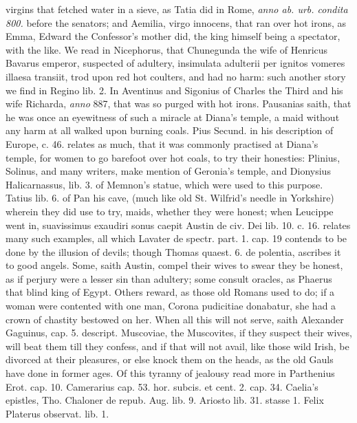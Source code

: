 virgins that fetched water in a sieve, as Tatia did in Rome, \emph{anno ab.
urb. condita 800.} before the senators; and Aemilia, virgo
innocens, that ran over hot irons, as Emma, Edward the Confessor's
mother did, the king himself being a spectator, with the like. We read
in Nicephorus, that Chunegunda the wife of Henricus Bavarus emperor,
suspected of adultery, insimulata adulterii per ignitos vomeres illaesa
transiit, trod upon red hot coulters, and had no harm: such another
story we find in Regino lib. 2. In Aventinus and Sigonius of Charles
the Third and his wife Richarda, \emph{anno} 887, that was so purged with hot
irons. Pausanias saith, that he was once an eyewitness of such a
miracle at Diana's temple, a maid without any harm at all walked upon
burning coals. Pius Secund. in his description of Europe, c. 46.
relates as much, that it was commonly practised at Diana's temple, for
women to go barefoot over hot coals, to try their honesties: Plinius,
Solinus, and many writers, make mention of Geronia's temple, and
Dionysius Halicarnassus, lib. 3. of Memnon's statue, which were used to
this purpose. Tatius lib. 6. of Pan his cave, (much like old St.
Wilfrid's needle in Yorkshire) wherein they did use to try, maids,
whether they were honest; when Leucippe went in, suavissimus
exaudiri sonus caepit Austin de civ. Dei lib. 10. c. 16. relates many
such examples, all which Lavater de spectr. part. 1. cap. 19 contends
to be done by the illusion of devils; though Thomas quaest. 6. de
polentia, \etc{} ascribes it to good angels. Some, saith Austin,
compel their wives to swear they be honest, as if perjury were a lesser
sin than adultery; some consult oracles, as Phaerus that blind
king of Egypt. Others reward, as those old Romans used to do; if a
woman were contented with one man, Corona pudicitiae donabatur, she had
a crown of chastity bestowed on her. When all this will not serve,
saith Alexander Gaguinus, cap. 5. descript. Muscoviae, the Muscovites,
if they suspect their wives, will beat them till they confess, and if
that will not avail, like those wild Irish, be divorced at their
pleasures, or else knock them on the heads, as the old Gauls have
done in former ages. Of this tyranny of jealousy read more in
Parthenius Erot. cap. 10. Camerarius cap. 53. hor. subcis. et cent. 2.
cap. 34. Caelia's epistles, Tho. Chaloner de repub. Aug. lib. 9.
Ariosto lib. 31. stasse 1. Felix Platerus observat. lib. 1. \etc{}

